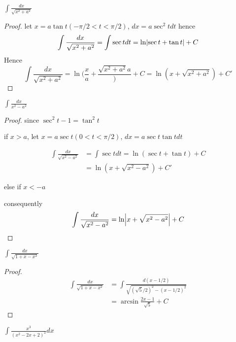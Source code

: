 \documentclass[11pt]{article}
\begin{document}
\begin{proposition}[]
\(\int\frac{dx}{\sqrt{x^2+a^2}}\)
\end{proposition}

\begin{proof}
let \(x=a\tan t(-\pi/2<t<\pi/2)\), \(dx=a\sec^2tdt\)
hence
\begin{equation*}
\int\frac{dx}{\sqrt{x^2+a^2}}=\int\sec tdt=\ln\abs{\sec t+\tan t}+C
\end{equation*}
Hence
\begin{equation*}
\int\frac{dx}{\sqrt{x^2+a^2}}=\ln(\frac{x}{a}+\frac{\sqrt{x^2+a^2}{a}})+C=\ln(x+\sqrt{x^2+a^2})+C'
\end{equation*}
\end{proof}

\begin{proposition}[]
\(\int\frac{dx}{x^2-a^2}\)
\end{proposition}

\begin{proof}
since \(\sec^2t-1=\tan^2t\)

if \(x>a\), let \(x=a\sec t(0<t<\pi/2)\), \(dx=a\sec t\tan tdt\)

\begin{align*}
\int\frac{dx}{\sqrt{x^2-a^2}}&=\int\sec tdt=\ln(\sec t+\tan t)+C\\
&=\ln(x+\sqrt{x^2-a^2})+C'
\end{align*}

else if \(x<-a\)

consequently
\begin{equation*}
\int\frac{dx}{\sqrt{x^2-a^2}}=\ln\abs{x+\sqrt{x^2-a^2}}+C
\end{equation*}
\end{proof}

\begin{proposition}[]
\(\int\frac{dx}{\sqrt{1+x-x^2}}\)
\end{proposition}

\begin{proof}
    \begin{align*}
\int\frac{dx}{\sqrt{1+x-x^2}}&=\int\frac{d(x-1/2)}{\sqrt{(\sqrt{5}/2)^2-(x-1/2)^2}}\\
&=\arcsin\frac{2x-1}{\sqrt{5}}+C
\end{align*}
\end{proof}


\begin{proposition}[]
\(\int\frac{x^3}{(x^2-2x+2)^2}dx\)
\end{proposition}
\end{document}
